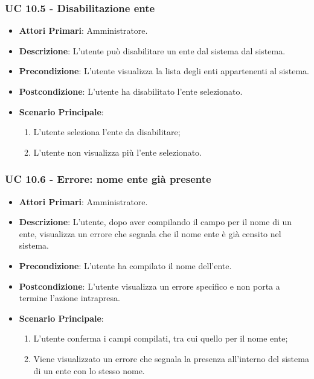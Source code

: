 			\subsubsection{UC 10.5 - Disabilitazione ente}
			\begin{itemize}
				\item \textbf{Attori Primari}: Amministratore.
				\item \textbf{Descrizione}: L'utente può disabilitare un ente dal sistema dal sistema.
				\item \textbf{Precondizione}: L'utente visualizza la lista degli enti appartenenti al sistema.
				\item \textbf{Postcondizione}: L'utente ha disabilitato l'ente selezionato.
				\item \textbf{Scenario Principale}:
				\begin{enumerate}
					\item{L'utente seleziona l'ente da disabilitare;}
					\item{L'utente non visualizza più l'ente selezionato.}
				\end{enumerate}	
			\end{itemize}	

			\subsubsection{UC 10.6 - Errore: nome ente già presente}
			\begin{itemize}
				\item \textbf{Attori Primari}: Amministratore.
				\item \textbf{Descrizione}: L'utente, dopo aver compilando il campo per il nome di un ente, visualizza un errore che segnala che il nome ente è già censito nel sistema.
				\item \textbf{Precondizione}: L'utente ha compilato il nome dell'ente.
				\item \textbf{Postcondizione}: L'utente visualizza un errore specifico e non porta a termine l'azione intrapresa.
				\item \textbf{Scenario Principale}:
				\begin{enumerate}
					\item{L'utente conferma i campi compilati, tra cui quello per il nome ente;}
					\item{Viene visualizzato un errore che segnala la presenza all'interno del sistema di un ente con lo stesso nome.}
				\end{enumerate}	
			\end{itemize}			